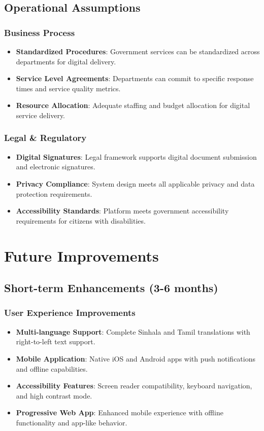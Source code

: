 \documentclass[12pt,a4paper]{article}
\begin{document}
\subsection{Operational Assumptions}

\subsubsection{Business Process}
\begin{itemize}[leftmargin=*]
    \item \textbf{Standardized Procedures}: Government services can be standardized across departments for digital delivery.
    \item \textbf{Service Level Agreements}: Departments can commit to specific response times and service quality metrics.
    \item \textbf{Resource Allocation}: Adequate staffing and budget allocation for digital service delivery.
\end{itemize}

\subsubsection{Legal \& Regulatory}
\begin{itemize}[leftmargin=*]
    \item \textbf{Digital Signatures}: Legal framework supports digital document submission and electronic signatures.
    \item \textbf{Privacy Compliance}: System design meets all applicable privacy and data protection requirements.
    \item \textbf{Accessibility Standards}: Platform meets government accessibility requirements for citizens with disabilities.
\end{itemize}

\section{Future Improvements}

\subsection{Short-term Enhancements (3-6 months)}

\subsubsection{User Experience Improvements}
\begin{itemize}[leftmargin=*]
    \item \textbf{Multi-language Support}: Complete Sinhala and Tamil translations with right-to-left text support.
    \item \textbf{Mobile Application}: Native iOS and Android apps with push notifications and offline capabilities.
    \item \textbf{Accessibility Features}: Screen reader compatibility, keyboard navigation, and high contrast mode.
    \item \textbf{Progressive Web App}: Enhanced mobile experience with offline functionality and app-like behavior.
\end{itemize}
\end{document}
